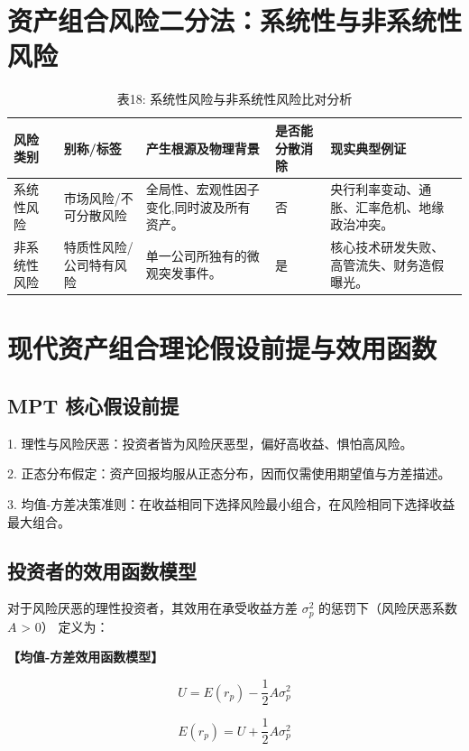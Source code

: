 \documentclass[lang=cn,10pt,color=blue]{elegantbook}
\begin{document}
\section{资产组合风险二分法：系统性与非系统性风险}

\begin{table}[ht]
  \centering
  \caption{表18: 系统性风险与非系统性风险比对分析}
  \renewcommand{\arraystretch}{1.4}
\begin{tabularx}{\textwidth}{llYYY}
  \toprule
  风险类别 & 别称/标签 & 产生根源及物理背景 & 是否能分散消除 & 现实典型例证 \\
  \midrule
  系统性风险 & 市场风险/不可分散风险 & 全局性、宏观性因子变化,同时波及所有资产。 & 否 & 央行利率变动、通胀、汇率危机、地缘政治冲突。 \\
  非系统性风险 & 特质性风险/公司特有风险 & 单一公司所独有的微观突发事件。 & 是 & 核心技术研发失败、高管流失、财务造假曝光。 \\
  \bottomrule
\end{tabularx}
\end{table}

\section{现代资产组合理论假设前提与效用函数}

\subsection{MPT 核心假设前提}

1. 理性与风险厌恶：投资者皆为风险厌恶型，偏好高收益、惧怕高风险。 

2. 正态分布假定：资产回报均服从正态分布，因而仅需使用期望值与方差描述。 

3. 均值-方差决策准则：在收益相同下选择风险最小组合，在风险相同下选择收益最大组合。 

\subsection{投资者的效用函数模型}

对于风险厌恶的理性投资者，其效用在承受收益方差 $\sigma _ { p } ^ { 2 }$ 的惩罚下（风险厌恶系数 $A$ > 0） 定义为： 

\textbf{\color{UnivColor} 【均值-方差效用函数模型】} 

$$
\boxed {U = E (r _ {p}) - \frac {1}{2} A \sigma_ {p} ^ {2}}
$$

$$
\boxed {E (r _ {p}) = U + \frac {1}{2} A \sigma_ {p} ^ {2}}
$$
\end{document}
